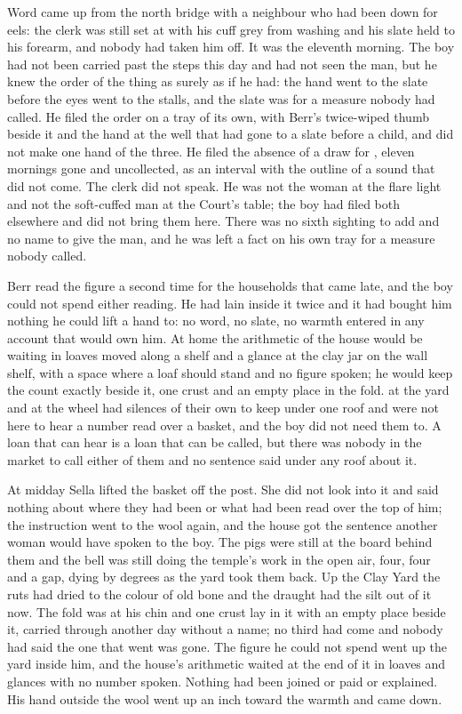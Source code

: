 Word came up from the north bridge with a neighbour who had been down for eels: the clerk was still set at  with his cuff grey from washing and his slate held to his forearm, and nobody had taken him off. It was the eleventh morning. The boy had not been carried past the steps this day and had not seen the man, but he knew the order of the thing as surely as if he had: the hand went to the slate before the eyes went to the stalls, and the slate was for a measure nobody had called. He filed the order on a tray of its own, with Berr's twice-wiped thumb beside it and the hand at the well that had gone to a slate before a child, and did not make one hand of the three. He filed the absence of a draw for , eleven mornings gone and uncollected, as an interval with the outline of a sound that did not come. The clerk did not speak. He was not the woman at the flare light and not the soft-cuffed man at the Court's table; the boy had filed both elsewhere and did not bring them here. There was no sixth sighting to add and no name to give the man, and he was left a fact on his own tray for a measure nobody called.

Berr read the figure a second time for the households that came late, and the boy could not spend either reading. He had lain inside it twice and it had bought him nothing he could lift a hand to: no word, no slate, no warmth entered in any account that would own him. At home the arithmetic of the house would be waiting in loaves moved along a shelf and a glance at the clay jar on the wall shelf, with a space where a loaf should stand and no figure spoken; he would keep the count exactly beside it, one crust and an empty place in the fold.  at the yard and  at the wheel had silences of their own to keep under one roof and were not here to hear a number read over a basket, and the boy did not need them to. A loan that can hear is a loan that can be called, but there was nobody in the market to call either of them and no sentence said under any roof about it.

At midday Sella lifted the basket off the post. She did not look into it and said nothing about where they had been or what had been read over the top of him; the instruction went to the wool again, and the house got the sentence another woman would have spoken to the boy. The pigs were still at the board behind them and the bell was still doing the temple's work in the open air, four, four and a gap, dying by degrees as the yard took them back. Up the Clay Yard the ruts had dried to the colour of old bone and the draught had the silt out of it now. The fold was at his chin and one crust lay in it with an empty place beside it, carried through another day without a name; no third had come and nobody had said the one that went was gone. The figure he could not spend went up the yard inside him, and the house's arithmetic waited at the end of it in loaves and glances with no number spoken. Nothing had been joined or paid or explained. His hand outside the wool went up an inch toward the warmth and came down.
